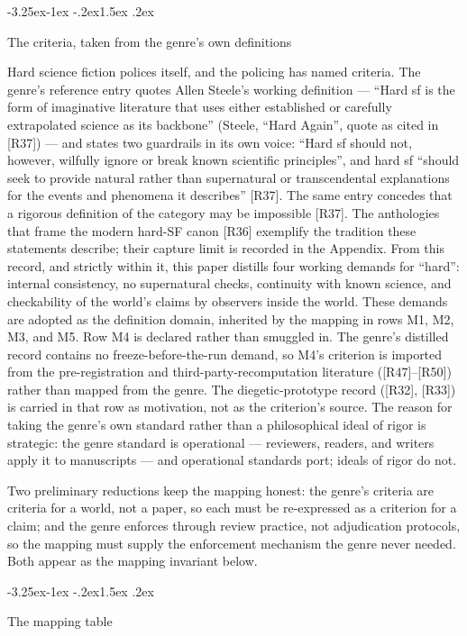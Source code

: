 \documentclass[11pt,a4paper]{article}
\makeatletter
\renewcommand\subsection{\@startsection{subsection}{2}{\z@}%
  {-3.25ex\@plus -1ex \@minus -.2ex}{1.5ex \@plus .2ex}%
  {\normalfont\large\bfseries\raggedright}}
\makeatother
\begin{document}
\subsection{The criteria, taken from the genre's own definitions}

Hard science fiction polices itself, and the policing has named criteria. The genre's reference entry quotes Allen Steele's working definition — ``Hard sf is the form of imaginative literature that uses either established or carefully extrapolated science as its backbone'' (Steele, ``Hard Again'', quote as cited in [R37]) — and states two guardrails in its own voice: ``Hard sf should not, however, wilfully ignore or break known scientific principles'', and hard sf ``should seek to provide natural rather than supernatural or transcendental explanations for the events and phenomena it describes'' [R37]. The same entry concedes that a rigorous definition of the category may be impossible [R37]. The anthologies that frame the modern hard-SF canon [R36] exemplify the tradition these statements describe; their capture limit is recorded in the Appendix. From this record, and strictly within it, this paper distills four working demands for ``hard'': internal consistency, no supernatural checks, continuity with known science, and checkability of the world's claims by observers inside the world. These demands are adopted as the definition domain, inherited by the mapping in rows M1, M2, M3, and M5. Row M4 is declared rather than smuggled in. The genre's distilled record contains no freeze-before-the-run demand, so M4's criterion is imported from the pre-registration and third-party-recomputation literature ([R47]–[R50]) rather than mapped from the genre. The diegetic-prototype record ([R32], [R33]) is carried in that row as motivation, not as the criterion's source. The reason for taking the genre's own standard rather than a philosophical ideal of rigor is strategic: the genre standard is operational — reviewers, readers, and writers apply it to manuscripts — and operational standards port; ideals of rigor do not.

Two preliminary reductions keep the mapping honest: the genre's criteria are criteria for a world, not a paper, so each must be re-expressed as a criterion for a claim; and the genre enforces through review practice, not adjudication protocols, so the mapping must supply the enforcement mechanism the genre never needed. Both appear as the mapping invariant below.

\subsection{The mapping table}
\end{document}
